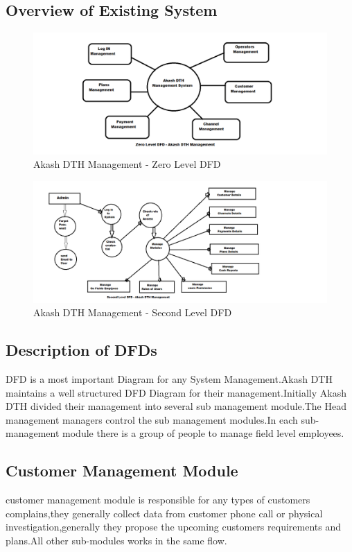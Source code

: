 \begin{spacing}{1}
\section{Overview of Existing System}
\begin{figure}[H]
	\centering
	\includegraphics[width=1.2\textwidth]{DFD1}
	\caption{Akash DTH Management - Zero Level DFD}
	\label{fig:dfd1}
\end{figure}
\begin{figure}[H]
	\centering
	\includegraphics[width=1.2\textwidth]{DFD2}
	\caption{Akash DTH Management - Second Level DFD}
	\label{fig:dfd2}
\end{figure}
\subsection{Description of DFDs}
DFD is a most important Diagram for any System Management.Akash DTH maintains a well structured DFD Diagram for their management.Initially Akash DTH divided their management into several sub management module.The Head management managers control the sub management modules.In each sub-management module there is a group of people to manage field level employees.

\subsection{Customer Management Module}
customer management module is responsible for any types of customers complains,they generally collect data from customer phone call or physical investigation,generally they propose the upcoming customers requirements and plans.All other sub-modules works in the same flow. 


\end{spacing}
